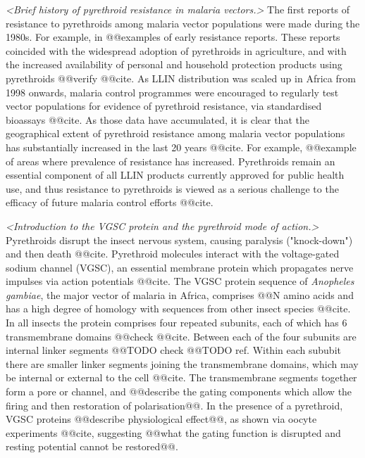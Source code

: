 \documentclass[a4paper,11pt,abstracton,hidelinks]{scrartcl}
\begin{document}
\textit{<Brief history of pyrethroid resistance in malaria vectors.>}
%
The first reports of resistance to pyrethroids among malaria vector populations were made during the 1980s.
%
For example, in @@examples of early resistance reports.
%
These reports coincided with the widespread adoption of pyrethroids in agriculture, and with the increased availability of personal and household protection products using pyrethroids @@verify @@cite.
%
As LLIN distribution was scaled up in Africa from 1998 onwards, malaria control programmes were encouraged to regularly test vector populations for evidence of pyrethroid resistance, via standardised bioassays @@cite.
%
As those data have accumulated, it is clear that the geographical extent of pyrethroid resistance among malaria vector populations has substantially increased in the last 20 years @@cite.
%
For example, @@example of areas where prevalence of resistance has increased.
%
Pyrethroids remain an essential component of all LLIN products currently approved for public health use, and thus resistance to pyrethroids is viewed as a serious challenge to the efficacy of future malaria control efforts @@cite.


\textit{<Introduction to the VGSC protein and the pyrethroid mode of action.>}
%
Pyrethroids disrupt the insect nervous system, causing paralysis ("knock-down") and then death @@cite.
%
Pyrethroid molecules interact with the voltage-gated sodium channel (VGSC), an essential membrane protein which propagates nerve impulses via action potentials @@cite.
%
The VGSC protein sequence of \textit{Anopheles gambiae}, the major vector of malaria in Africa, comprises @@N amino acids and has a high degree of homology with sequences from other insect species @@cite.
%
In all insects the protein comprises four repeated subunits, each of which has 6 transmembrane domains @@check @@cite.
%
Between each of the four subunits are internal linker segments @@TODO check @@TODO ref.
%
Within each sububit there are smaller linker segments joining the transmembrane domains, which may be internal or external to the cell @@cite.
%
The transmembrane segments together form a pore or channel, and @@describe the gating components which allow the firing and then restoration of polarisation@@.
%
In the presence of a pyrethroid, VGSC proteins @@describe physiological effect@@, as shown via oocyte experiments @@cite, suggesting @@what the gating function is disrupted and resting potential cannot be restored@@.
\end{document}
